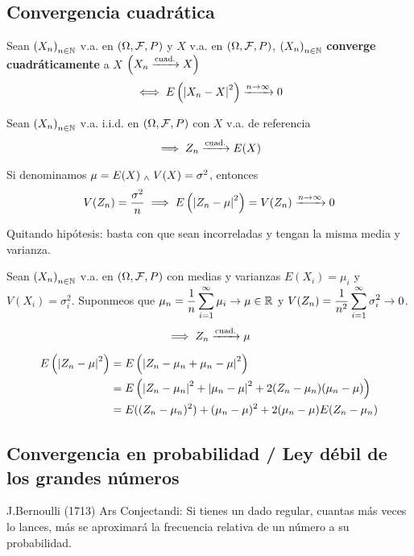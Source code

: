 \subsection{Convergencia cuadrática}

\begin{defn}
	Sean $\left(X_n\right)_{n\in \mathbb{N}}$ v.a. en $(\Omega, \mathcal{F}, P)$ y $X$ v.a. en $(\Omega, \mathcal{F}, P)$, $\left(X_n\right)_{n\in \mathbb{N}}$ \textbf{converge cuadráticamente} a $X$ $\left(X_n \xrightarrow{\text{cuad.}} X\right)$
	\[\iff E\left(\left|X_n - X\right|^2\right) \xrightarrow{n\to\infty} 0\]
\end{defn}

\begin{teo}
	Sean $\left(X_n\right)_{n\in \mathbb{N}}$ v.a. i.i.d. en $(\Omega, \mathcal{F}, P)$ con $X$ v.a. de referencia
	\[\implies Z_n\xrightarrow{\text{cuad.}} E(X)\]
	\begin{dem}
		Si denominamos $\mu = E(X) \; _{\wedge} \; V(X) = \sigma^2$, entonces
		\[V(Z_n)=\frac{\sigma^2}{n} \implies E\left(\left|Z_n - \mu\right|^2\right) = V(Z_n) \xrightarrow{n\to\infty} 0\]
	\end{dem}
	Quitando hipótesis: basta con que sean incorreladas y tengan la misma media y varianza.
\end{teo}

\begin{teo}
	Sean $\left(X_n\right)_{n\in \mathbb{N}}$ v.a. en $(\Omega, \mathcal{F}, P)$ con medias y varianzas $E(X_i) = \mu_i$ y $V(X_i) = \sigma_i^2$. Suponmeos que $\displaystyle \mu_n = \frac{1}{n}\sum_{i=1}^{\infty} \mu_i \to \mu \in \mathbb{R}$ y $\displaystyle V(Z_n) = \frac{1}{n^2}\sum_{i=1}^{\infty} \sigma_i^2 \to 0$.
	\[\implies Z_n \xrightarrow{\text{cuad.}} \mu\]
	\begin{dem} %
		\[\begin{aligned}
				E\left(\left|Z_n - \mu\right|^2\right) & = E\left(\left|Z_n - \mu_n + \mu_n - \mu\right|^2\right)                                       \\
				                                & = E\left(\left|Z_n - \mu_n\right|^2 + \left|\mu_n - \mu\right|^2 + 2(Z_n - \mu_n)(\mu_n - \mu)\right) \\
				                                & = E((Z_n - \mu_n)^2) + (\mu_n - \mu)^2 + 2(\mu_n - \mu)E(Z_n - \mu_n)
			\end{aligned}\]
	\end{dem}
\end{teo}

\subsection{Convergencia en probabilidad / Ley débil de los grandes números}

J.Bernoulli (1713) Ars Conjectandi: Si tienes un dado regular, cuantas más veces lo lances, más se aproximará la frecuencia relativa de un número a su probabilidad.
